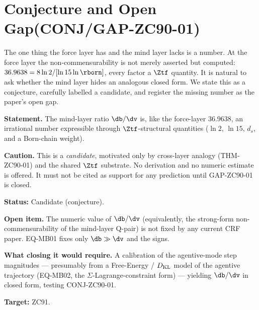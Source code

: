 \documentclass[12pt, a4paper]{article}
\begin{document}
\section{Conjecture and Open Gap\quad(CONJ/GAP-ZC90-01)}
\label{sec:conjgap-zc90}

The one thing the force layer has and the mind layer lacks is a number.
At the force layer the non-commensurability is not merely asserted but
computed: $36.9638=8\ln2/[\ln15\ln\rborn]$, every factor a $\Ztf$
quantity. It is natural to ask whether the mind layer hides an analogous
closed form. We state this as a conjecture, carefully labelled a
candidate, and register the missing number as the paper's open gap.

\begin{derivedbox}[title={CONJ-ZC90-01: The Mind Ratio Is a
  $\Ztf$-Structural Irrational (Candidate)}]
\textbf{Statement.} The mind-layer ratio $\db/\dv$ is, like the
force-layer $36.9638$, an irrational number expressible through
$\Ztf$-structural quantities ($\ln2$, $\ln15$, $d_s$, and a Born-chain
weight).

\textbf{Caution.} This is a \emph{candidate}, motivated only by
cross-layer analogy (THM-ZC90-01) and the shared $\Ztf$ substrate. No
derivation and no numeric estimate is offered. It must not be cited as
support for any prediction until GAP-ZC90-01 is closed.

\textbf{Status:} Candidate (conjecture).
\end{derivedbox}

\begin{openqbox}[title={GAP-ZC90-01: The Mind-Layer Step Ratio Is
  Undetermined}]
\textbf{Open item.} The numeric value of $\db/\dv$ (equivalently, the
strong-form non-commensurability of the mind-layer Q-pair) is not fixed
by any current CRF paper. EQ-MB01 fixes only $\db\gg\dv$ and the signs.

\textbf{What closing it would require.} A calibration of the agentive-mode
step magnitudes --- presumably from a Free-Energy / $D_{\rm KL}$ model of
the agentive trajectory (EQ-MB02, the $\Sigma$-Lagrange-constraint form)
--- yielding $\db/\dv$ in closed form, testing CONJ-ZC90-01.

\textbf{Target:} ZC91.
\end{openqbox}

\end{document}
